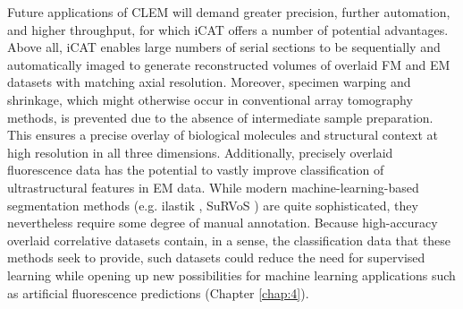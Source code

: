 Future applications of CLEM will demand greater precision, further automation, and higher throughput, for which iCAT offers a number of potential advantages. Above all, iCAT enables large numbers of serial sections to be sequentially and automatically imaged to generate reconstructed volumes of overlaid FM and EM datasets with matching axial resolution. Moreover, specimen warping and shrinkage, which might otherwise occur in conventional array tomography methods, is prevented due to the absence of intermediate sample preparation. This ensures a precise overlay of biological molecules and structural context at high resolution in all three dimensions. Additionally, precisely overlaid fluorescence data has the potential to vastly improve classification of ultrastructural features in EM data. While modern machine-learning-based segmentation methods (e.g. ilastik \cite{sommer2011ilastik}, SuRVoS \cite{luengo2017survos}) are quite sophisticated, they nevertheless require some degree of manual annotation. Because high-accuracy overlaid correlative datasets contain, in a sense, the classification data that these methods seek to provide, such datasets could reduce the need for supervised learning while opening up new possibilities for machine learning applications such as artificial fluorescence predictions (Chapter \ref{chap:4}). 
